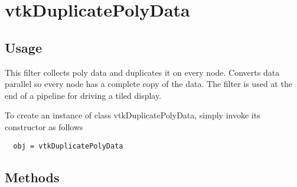 \section{vtkDuplicatePolyData}

\subsection{Usage}

 This filter collects poly data and duplicates it on every node.
 Converts data parallel so every node has a complete copy of the data.
 The filter is used at the end of a pipeline for driving a tiled
 display.

To create an instance of class vtkDuplicatePolyData, simply
invoke its constructor as follows
\begin{verbatim}
  obj = vtkDuplicatePolyData
\end{verbatim}
\subsection{Methods}

